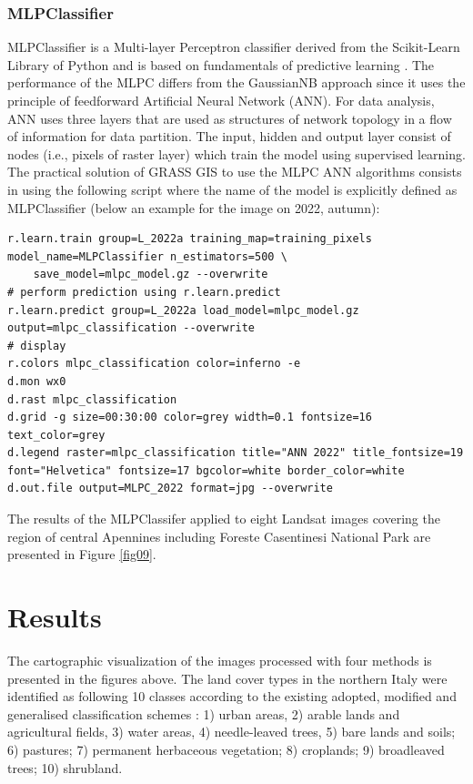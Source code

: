 \documentclass[preprint,12pt,authoryear]{elsarticle}
\begin{document}
\subsubsection{MLPClassifier}

MLPClassifier is a Multi-layer Perceptron classifier derived from the Scikit-Learn Library of Python and is based on fundamentals of predictive learning \cite{Rosenblatt}. The performance of the MLPC differs from the GaussianNB approach since it uses the principle of feedforward Artificial Neural Network (ANN). For data analysis, ANN uses three layers that are used as structures of network topology in a flow of information for data partition. The input, hidden and output layer consist of nodes (i.e., pixels of raster layer) which train the model using supervised learning. The practical solution of GRASS GIS to use the MLPC ANN algorithms consists in using the following script where the name of the model is explicitly defined as MLPClassifier (below an example for the image on 2022, autumn): 

\begin{footnotesize}
\begin{verbatim}
r.learn.train group=L_2022a training_map=training_pixels model_name=MLPClassifier n_estimators=500 \
    save_model=mlpc_model.gz --overwrite
# perform prediction using r.learn.predict
r.learn.predict group=L_2022a load_model=mlpc_model.gz output=mlpc_classification --overwrite
# display
r.colors mlpc_classification color=inferno -e
d.mon wx0
d.rast mlpc_classification
d.grid -g size=00:30:00 color=grey width=0.1 fontsize=16 text_color=grey
d.legend raster=mlpc_classification title="ANN 2022" title_fontsize=19 font="Helvetica" fontsize=17 bgcolor=white border_color=white
d.out.file output=MLPC_2022 format=jpg --overwrite
\end{verbatim}
\end{footnotesize}

The results of the MLPClassifer applied to eight Landsat images covering the region of central Apennines including Foreste Casentinesi National Park are presented in Figure \ref{fig09}.

\section{Results}

The cartographic visualization of the images processed with four methods is presented in the figures above. The land cover types in the northern Italy were identified as following 10 classes according to the existing adopted, modified and generalised classification schemes \cite{DeFioravante}: 1) urban areas, 2) arable lands and agricultural fields, 3) water areas, 4) needle-leaved trees, 5) bare lands and soils; 6) pastures; 7) permanent herbaceous vegetation; 8) croplands; 9) broadleaved trees; 10) shrubland. 
\end{document}
